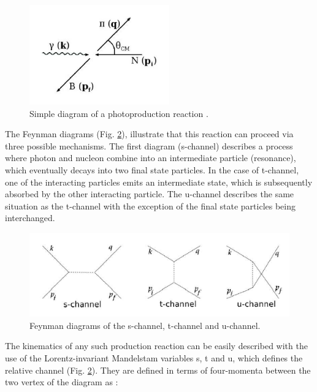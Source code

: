 \begin{figure}[H]
\begin{center}
\includegraphics[scale=0.8]{pictures/png/photorea.png}
\caption{Simple diagram of a photoproduction reaction \cite{jo}.}
\label{photorea}
\end{center}
\end{figure}

\indent The Feynman diagrams (Fig. \ref{mandelstam}), illustrate that this reaction can proceed via three possible mechanisms. The first diagram (s-channel) describes a process where photon and nucleon combine into an intermediate particle (resonance), which eventually decays into two final state particles. In the case of t-channel, one of the interacting particles emits an intermediate state, which is subsequently absorbed by the other interacting particle. The u-channel describes the same situation as the t-channel with the exception of the final state particles being interchanged.

\begin{figure}[H]
\begin{center}
\includegraphics[scale=0.7]{pictures/png/mandelstam.png}
\caption{Feynman diagrams of the s-channel, t-channel and u-channel.}
\label{mandelstam}
\end{center}
\end{figure}

\indent The kinematics of any such production reaction can be easily described with the use of the Lorentz-invariant Mandelstam variables s, t and u, which defines the relative channel (Fig. \ref{mandelstam}). They are defined in terms of four-momenta between the two vertex of the diagram as \cite{walker}:

